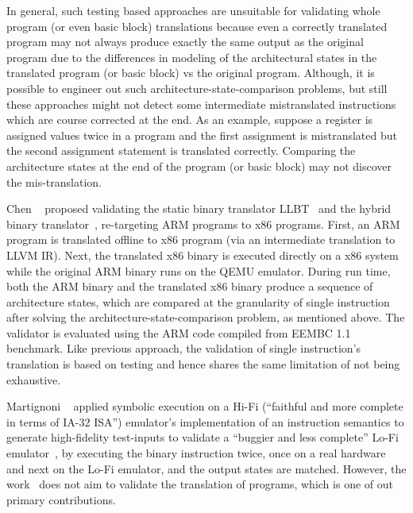 
In general, such testing based approaches are unsuitable for validating whole
program (or even basic block) translations because even a correctly translated
program may not always produce exactly the same output as the original program
due to the differences in modeling of the architectural states in the
translated program (or basic block) vs the original program. Although, it is 
possible to engineer out such architecture-state-comparison problems, but still 
these approaches might
not
detect some intermediate mistranslated instructions which are course corrected
at the end. As an example, suppose  a register is assigned values twice in a
program and the first assignment is mistranslated but the second assignment
statement is translated correctly. Comparing the architecture states at the end
of the program (or basic block) may not discover the mis-translation.


Chen \etal~\cite{CLSS2015} proposed validating the static binary translator
LLBT~\cite{LLBT2012} and the hybrid binary translator~\cite{LLVMDBT2012},
  re-targeting ARM programs to x86 programs. First, an ARM program is
  translated offline to x86 program (via an intermediate translation to LLVM 
  IR). Next, the translated x86 binary is
  executed  directly on a x86 system while the original ARM binary runs on the
  QEMU emulator. During run time, both the ARM binary and the translated x86
  binary produce a sequence of  architecture states, which are compared at the
  granularity of single instruction after solving the 
  architecture-state-comparison problem, as mentioned above. The validator is
  evaluated using the ARM code compiled from EEMBC 1.1 benchmark. Like previous
  approach, the validation of single instruction's translation is
based on testing and hence shares the same limitation of not being exhaustive.

Martignoni \etal~\cite{Martignoni:ASPLOS2012} applied symbolic execution on a
Hi-Fi (``faithful and more complete in terms of IA-32 ISA'')
emulator\cite{Bochs1996}'s implementation of an instruction semantics to
generate
high-fidelity test-inputs to validate a ``buggier and less complete'' Lo-Fi
emulator~\cite{QEMU:USENIX05},
by executing the binary instruction twice, once on a real hardware and next on
the Lo-Fi emulator, and the output states are matched. However, the 
work~\cite{Martignoni:ASPLOS2012} does not aim to validate the
translation of \ISA programs,
which is one of out primary contributions.

